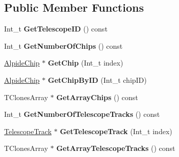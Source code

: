 \subsection*{Public Member Functions}
\begin{DoxyCompactItemize}
\item 
\mbox{\label{class_alpide_telescope_a08b55fa73a002383c979d3cb4b6cf92b}} 
Int\+\_\+t {\bfseries Get\+Telescope\+ID} () const
\item 
\mbox{\label{class_alpide_telescope_ad08cbfeba32729bb79dece254fb76fd9}} 
Int\+\_\+t {\bfseries Get\+Number\+Of\+Chips} () const
\item 
\mbox{\label{class_alpide_telescope_a619b34ba96df59daf0ddc85688138de5}} 
\mbox{\hyperlink{class_alpide_chip}{Alpide\+Chip}} $\ast$ {\bfseries Get\+Chip} (Int\+\_\+t index)
\item 
\mbox{\label{class_alpide_telescope_af784289725c4f35046e7e9b9c72d6d2b}} 
\mbox{\hyperlink{class_alpide_chip}{Alpide\+Chip}} $\ast$ {\bfseries Get\+Chip\+By\+ID} (Int\+\_\+t chip\+ID)
\item 
\mbox{\label{class_alpide_telescope_aa791e5afddf4cdd26ae5605856c3f6ce}} 
T\+Clones\+Array $\ast$ {\bfseries Get\+Array\+Chips} () const
\item 
\mbox{\label{class_alpide_telescope_a7a6acb8b7a6dc6884ebeee2abd5183af}} 
Int\+\_\+t {\bfseries Get\+Number\+Of\+Telescope\+Tracks} () const
\item 
\mbox{\label{class_alpide_telescope_a4469548599474de64296350ee4619bfb}} 
\mbox{\hyperlink{class_telescope_track}{Telescope\+Track}} $\ast$ {\bfseries Get\+Telescope\+Track} (Int\+\_\+t index)
\item 
\mbox{\label{class_alpide_telescope_ad90f4b2850c1adaa40e87e1668ae6f6e}} 
T\+Clones\+Array $\ast$ {\bfseries Get\+Array\+Telescope\+Tracks} () const
\item 
\mbox{\label{class_alpide_telescope_a8369dd2fbb5e8ef0f33b5e4353986b16}} 

\end{DoxyCompactItemize}
